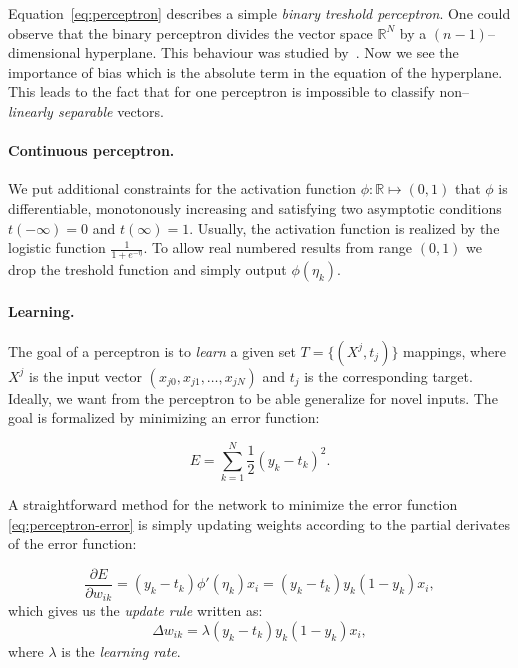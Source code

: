 Equation~\ref{eq:perceptron} describes a simple \emph{binary treshold perceptron}. One could observe that the binary perceptron divides the vector space $\mathbb{R}^N$ by a $(n-1)$--dimensional hyperplane. This behaviour was studied by~\citet{rosenblatt1958perceptron}. Now we see the importance of bias which is the absolute term in the equation of the hyperplane. \label{sec:linear-sep} This leads to the fact that for one perceptron is impossible to classify non--\emph{linearly separable} vectors. 

\paragraph{Continuous perceptron.}
We put additional constraints for the activation function $\phi : \mathbb{R} \mapsto (0,1)$ that $\phi$ is differentiable, monotonously increasing and satisfying two asymptotic conditions $t(-\infty)=0$ and $t(\infty)=1$.  Usually, the activation function is realized by the logistic function $\frac{1}{1 + e^{-\eta}}$. To allow real numbered results from range $(0,1)$ we drop the treshold function and simply output $\phi(\eta_k)$. 

\paragraph{Learning.} 
The goal of a perceptron is to \emph{learn} a given set $T = \{(X^j, t_j)\}$ mappings, where $X^j$ is the input vector $(x_{j0},x_{j1}, \ldots, x_{jN})$ and $t_j$ is the corresponding target. Ideally, we want from the perceptron to be able generalize for novel inputs. The goal is formalized by minimizing an error function: 

\begin{equation}
\label{eq:perceptron-error} 
E = \sum_{k=1}^{N} \frac{1}{2}(y_k-t_k)^2.
\end{equation} 

A straightforward method for the network to minimize the error function \ref{eq:perceptron-error} is simply updating weights according to the partial derivates of the error function: 

\begin{equation}
\label{eq:perceptron-learning} 
\frac{\partial E}{\partial w_{ik}} = (y_k - t_k)\phi'(\eta_k)x_i = (y_k - t_k)y_k(1 - y_k)x_i,
\end{equation} 
which gives us the \emph{update rule} written as: 
\
\begin{equation} 
\label{eq:perceptron-learning-rule} 
\Delta w_{ik} = \lambda (y_k - t_k)y_k(1 - y_k)x_i,
\end{equation} 
where $\lambda$ is the \emph{learning rate}. 

